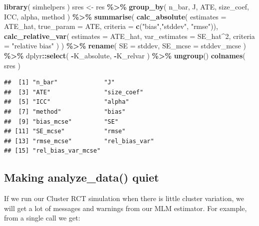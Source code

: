 \documentclass[
]{book}
\newenvironment{Shaded}{\begin{snugshade}}{\end{snugshade}}
\newcommand{\AttributeTok}[1]{\textcolor[rgb]{0.13,0.29,0.53}{#1}}
\newcommand{\DecValTok}[1]{\textcolor[rgb]{0.00,0.00,0.81}{#1}}
\newcommand{\FunctionTok}[1]{\textcolor[rgb]{0.13,0.29,0.53}{\textbf{#1}}}
\newcommand{\NormalTok}[1]{#1}
\newcommand{\OtherTok}[1]{\textcolor[rgb]{0.56,0.35,0.01}{#1}}
\newcommand{\SpecialCharTok}[1]{\textcolor[rgb]{0.81,0.36,0.00}{\textbf{#1}}}
\newcommand{\StringTok}[1]{\textcolor[rgb]{0.31,0.60,0.02}{#1}}
\begin{document}
\begin{Shaded}
\begin{Highlighting}[]
\FunctionTok{library}\NormalTok{( simhelpers )}
\NormalTok{sres }\OtherTok{\textless{}{-}}\NormalTok{ res }\SpecialCharTok{\%\textgreater{}\%} 
  \FunctionTok{group\_by}\NormalTok{( n\_bar, J, ATE, size\_coef, ICC, alpha, method ) }\SpecialCharTok{\%\textgreater{}\%}
  \FunctionTok{summarise}\NormalTok{( }\FunctionTok{calc\_absolute}\NormalTok{( }\AttributeTok{estimates =}\NormalTok{ ATE\_hat,}
                            \AttributeTok{true\_param =}\NormalTok{ ATE,}
                            \AttributeTok{criteria =} \FunctionTok{c}\NormalTok{(}\StringTok{"bias"}\NormalTok{,}\StringTok{"stddev"}\NormalTok{,}
                                         \StringTok{"rmse"}\NormalTok{)),}
             \FunctionTok{calc\_relative\_var}\NormalTok{( }\AttributeTok{estimates =}\NormalTok{ ATE\_hat,}
                                \AttributeTok{var\_estimates =}\NormalTok{ SE\_hat}\SpecialCharTok{\^{}}\DecValTok{2}\NormalTok{,}
                                \AttributeTok{criteria =} \StringTok{"relative bias"}\NormalTok{ ) ) }\SpecialCharTok{\%\textgreater{}\%}
  \FunctionTok{rename}\NormalTok{( }\AttributeTok{SE =}\NormalTok{ stddev,}
          \AttributeTok{SE\_mcse =}\NormalTok{ stddev\_mcse ) }\SpecialCharTok{\%\textgreater{}\%}
\NormalTok{  dplyr}\SpecialCharTok{::}\FunctionTok{select}\NormalTok{( }\SpecialCharTok{{-}}\NormalTok{K\_absolute, }\SpecialCharTok{{-}}\NormalTok{K\_relvar ) }\SpecialCharTok{\%\textgreater{}\%}
  \FunctionTok{ungroup}\NormalTok{()}
\FunctionTok{colnames}\NormalTok{( sres )}
\end{Highlighting}
\end{Shaded}

\begin{verbatim}
##  [1] "n_bar"             "J"                
##  [3] "ATE"               "size_coef"        
##  [5] "ICC"               "alpha"            
##  [7] "method"            "bias"             
##  [9] "bias_mcse"         "SE"               
## [11] "SE_mcse"           "rmse"             
## [13] "rmse_mcse"         "rel_bias_var"     
## [15] "rel_bias_var_mcse"
\end{verbatim}

\subsection{Making analyze\_data() quiet}\label{making-analyze_data-quiet}

If we run our Cluster RCT simulation when there is little cluster variation, we will get a lot of messages and warnings from our MLM estimator.
For example, from a single call we get:
\end{document}
